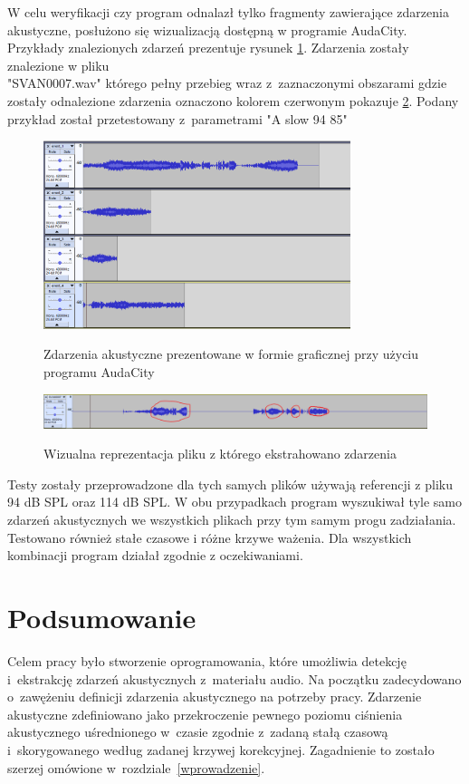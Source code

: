\documentclass[eng,printmode]{mgr}
\begin{document}
W celu weryfikacji czy program odnalazł tylko fragmenty zawierające zdarzenia akustyczne, posłużono się wizualizacją dostępną w programie AudaCity. Przykłady znalezionych zdarzeń prezentuje rysunek \ref{znalezione_zdarzenia}. Zdarzenia zostały znalezione w pliku \\"SVAN0007.wav" którego pełny przebieg wraz z~zaznaczonymi obszarami  gdzie zostały odnalezione zdarzenia oznaczono kolorem czerwonym pokazuje \ref{przebieg}. Podany przykład został przetestowany z~parametrami "A slow 94 85"

\begin{figure}[hbtp]
\caption{Zdarzenia akustyczne prezentowane w formie graficznej przy użyciu programu AudaCity}
\centering
\includegraphics[width=0.8\textwidth]{zdarzeniaAuda.PNG}
\label{znalezione_zdarzenia}
\end{figure}

\begin{figure}[hbtp]
\caption{Wizualna reprezentacja pliku z którego ekstrahowano zdarzenia}
\centering
\includegraphics[angle=90,origin=c, scale = 0.6]{oryginalAuda.PNG}
\label{przebieg}
\end{figure}

Testy zostały przeprowadzone dla tych samych plików używają referencji z pliku 94 dB SPL oraz 114 dB SPL. W obu przypadkach program wyszukiwał tyle samo zdarzeń akustycznych we wszystkich plikach przy tym samym progu zadziałania. Testowano również stałe czasowe i różne krzywe ważenia. Dla wszystkich kombinacji program działał zgodnie z oczekiwaniami. 

\chapter{Podsumowanie}
Celem pracy było stworzenie oprogramowania, które umożliwia detekcję i~ekstrakcję zdarzeń akustycznych z~materiału audio. Na początku zadecydowano o~zawężeniu definicji zdarzenia akustycznego na potrzeby pracy. Zdarzenie akustyczne zdefiniowano jako przekroczenie pewnego poziomu ciśnienia akustycznego uśrednionego w~czasie zgodnie z~zadaną stałą czasową i~skorygowanego według zadanej krzywej korekcyjnej. Zagadnienie to zostało szerzej omówione w~rozdziale~\ref{wprowadzenie}. 
\end{document}
